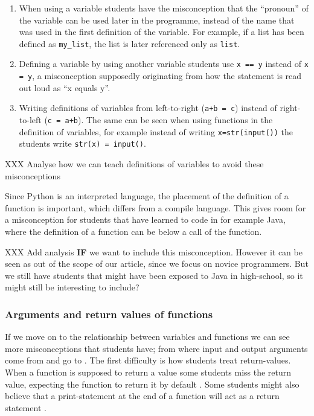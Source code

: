 \begin{enumerate}
    \item When using a variable students have the misconception that the 
      \enquote{pronoun} of the variable can be used later in the programme, 
      instead of the name that was used in the first definition of the 
      variable. For example, if a list has been defined as 
      \texttt{my_list}, the list is later referenced only as 
      \texttt{list}.
    \item Defining a variable by using another variable students use 
      \texttt{x == y} instead of \texttt{x = y}, a 
      misconception supposedly originating from how the statement is read out 
      loud as \enquote{x equals y}.
    \item Writing definitions of variables from left-to-right 
      (\texttt{a+b = c}) instead of right-to-left 
      (\texttt{c = a+b}). The same can be seen when using functions 
      in the definition of variables, for example instead of writing 
      \texttt{x=str(input())} the students write 
      \texttt{str(x) = input()}.
\end{enumerate}

XXX Analyse how we can teach definitions of variables to avoid these 
misconceptions

Since Python is an interpreted language, the placement of the definition of 
a function is important, which differs from a compile language. This gives 
room for a misconception for students that have learned to code in for 
example Java, where the definition of a function can be below a call of the 
function. 

XXX Add analysis \textbf{IF} we want to include this misconception. However 
it can be seen as out of the scope of our article, since we focus on novice 
programmers. But we still have students that might have been exposed to 
Java in high-school, so it might still be interesting to include?

\subsubsection{Arguments and return values of functions}

If we move on to the relationship between variables and functions we can see 
more misconceptions that students have; from where input and output 
arguments 
come from and go to \parencite{Ragonis2005OOP}.
The first difficulty is how students treat return-values. When a function is 
supposed to return a value some students miss the return value, expecting 
the 
function to return it by default \parencite{Kurvinen2016,KumarVeerasamy2016}
. Some students might also believe that a print-statement at the end of a 
function will act as a return statement \parencite{MisconceptionsSurvey2017}
. 

